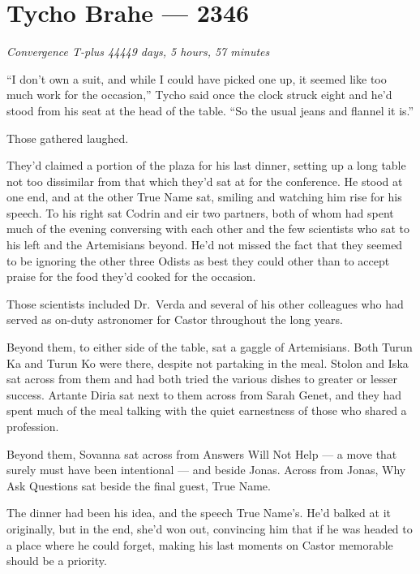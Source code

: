 \hypertarget{tycho-brahe-2346}{%
\chapter{Tycho Brahe — 2346}\label{tycho-brahe-2346}}

\begin{center}
\emph{Convergence T-plus 44449 days, 5 hours, 57 minutes}
\end{center}

\noindent ``I don't own a suit, and while I could have picked one up, it seemed like too much work for the occasion,'' Tycho said once the clock struck eight and he'd stood from his seat at the head of the table. ``So the usual jeans and flannel it is.''

Those gathered laughed.

They'd claimed a portion of the plaza for his last dinner, setting up a long table not too dissimilar from that which they'd sat at for the conference. He stood at one end, and at the other True Name sat, smiling and watching him rise for his speech. To his right sat Codrin and eir two partners, both of whom had spent much of the evening conversing with each other and the few scientists who sat to his left and the Artemisians beyond. He'd not missed the fact that they seemed to be ignoring the other three Odists as best they could other than to accept praise for the food they'd cooked for the occasion.

Those scientists included Dr.~Verda and several of his other colleagues who had served as on-duty astronomer for Castor throughout the long years.

Beyond them, to either side of the table, sat a gaggle of Artemisians. Both Turun Ka and Turun Ko were there, despite not partaking in the meal. Stolon and Iska sat across from them and had both tried the various dishes to greater or lesser success. Artante Diria sat next to them across from Sarah Genet, and they had spent much of the meal talking with the quiet earnestness of those who shared a profession.

Beyond them, Sovanna sat across from Answers Will Not Help — a move that surely must have been intentional — and beside Jonas. Across from Jonas, Why Ask Questions sat beside the final guest, True Name.

The dinner had been his idea, and the speech True Name's. He'd balked at it originally, but in the end, she'd won out, convincing him that if he was headed to a place where he could forget, making his last moments on Castor memorable should be a priority.

